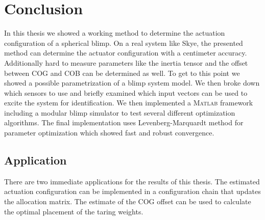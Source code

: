 \chapter{Conclusion}
\label{chap:conclusion}

In this thesis we showed a working method to determine the actuation configuration of a spherical blimp.
On a real system like Skye, the presented method can determine the actuator configuration with a centimeter accuracy.
Additionally hard to measure parameters like the inertia tensor and the offset between COG and COB can be determined as well.
To get to this point we showed a possible parametrization of a blimp system model.
We then broke down which sensors to use and briefly examined which input vectors can be used to excite the system for identification.
We then implemented a \textsc{Matlab} framework including a modular blimp simulator to test several different optimization algorithms.
The final implementation uses Levenberg-Marquardt method for parameter optimization which showed fast and robust convergence.\\



\section{Application}
There are two immediate applications for the results of this thesis.
The estimated actuation configuration can be implemented in a configuration chain that updates the allocation matrix.
The estimate of the COG offset can be used to calculate the optimal placement of the taring weights.

